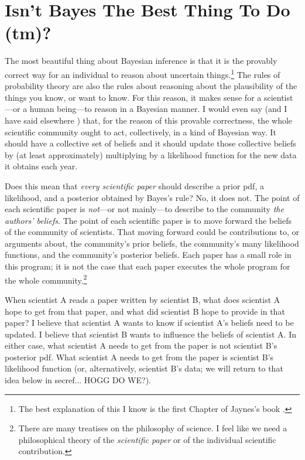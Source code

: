 \documentclass{article}
\begin{document}
\section{Isn't Bayes The Best Thing To Do (tm)?}\label{sec:bayes}
The most beautiful thing about Bayesian inference is that it is the provably correct way for an individual to reason about uncertain things.\footnote{%
The best explanation of this I know is the first Chapter of Jaynes's book \cite{jaynes}.}
The rules of probability theory are also the rules about reasoning about the plausibility of the things you know, or want to know.
For this reason, it makes sense for a scientist---or a human being---to reason in a Bayesian manner.
I would even say (and I have said elsewhere \cite{plausibility})
that, for the reason of this provable correctness, the whole scientific community ought to act, collectively, in a kind of Bayesian way.
It should have a collective set of beliefs and it should update those collective beliefs by (at least approximately) multiplying by a likelihood function for the new data it obtains each year.

Does this mean that \emph{every scientific paper} should describe a prior pdf, a likelihood, and a posterior obtained by Bayes's rule?
No, it does not.
The point of each scientific paper is \emph{not}---or not mainly---to describe to the community \emph{the authors' beliefs}.
The point of each scientific paper is to move forward the beliefs of the community of scientists.
That moving forward could be contributions to, or arguments about, the community's prior beliefs, the community's many likelihood functions, and the community's posterior beliefs.
Each paper has a small role in this program; it is not the case that each paper executes the whole program for the whole community.\footnote{%
There are many treatises on the philosophy of science.
I feel like we need a philosophical theory of the \emph{scientific paper} or of the individual scientific contribution.}

When scientist A reads a paper written by scientist B, what does scientist A hope to get from that paper, and what did scientist B hope to provide in that paper?
I believe that scientist A wants to know if scientist A's beliefs need to be updated.
I believe that scientist B wants to influence the beliefs of scientist A.
In either case, what scientist A needs to get from the paper is not scientist B's posterior pdf.
What scientist A needs to get from the paper is scientist B's likelihood function (or, alternatively, scientist B's data; we will return to that idea below in secref... HOGG DO WE?).
\end{document}
